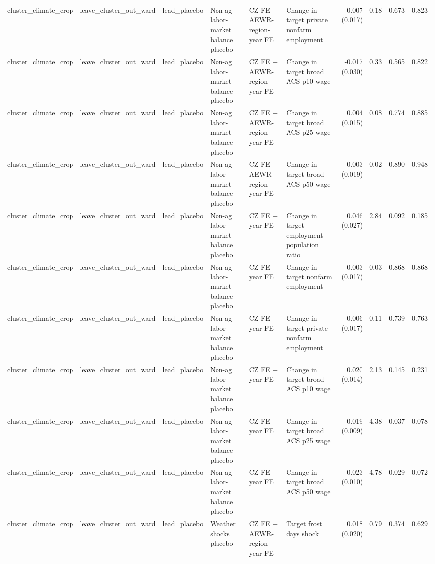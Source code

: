 \begin{tabular}{llllllrrrr}
cluster_climate_crop & leave_cluster_out_ward & lead_placebo & Non-ag labor-market balance placebo & CZ FE + AEWR-region-year FE & Change in target private nonfarm employment & 0.007 (0.017) & 0.18 & 0.673 & 0.823 \\
cluster_climate_crop & leave_cluster_out_ward & lead_placebo & Non-ag labor-market balance placebo & CZ FE + AEWR-region-year FE & Change in target broad ACS p10 wage & -0.017 (0.030) & 0.33 & 0.565 & 0.822 \\
cluster_climate_crop & leave_cluster_out_ward & lead_placebo & Non-ag labor-market balance placebo & CZ FE + AEWR-region-year FE & Change in target broad ACS p25 wage & 0.004 (0.015) & 0.08 & 0.774 & 0.885 \\
cluster_climate_crop & leave_cluster_out_ward & lead_placebo & Non-ag labor-market balance placebo & CZ FE + AEWR-region-year FE & Change in target broad ACS p50 wage & -0.003 (0.019) & 0.02 & 0.890 & 0.948 \\
cluster_climate_crop & leave_cluster_out_ward & lead_placebo & Non-ag labor-market balance placebo & CZ FE + year FE & Change in target employment-population ratio & 0.046 (0.027) & 2.84 & 0.092 & 0.185 \\
cluster_climate_crop & leave_cluster_out_ward & lead_placebo & Non-ag labor-market balance placebo & CZ FE + year FE & Change in target nonfarm employment & -0.003 (0.017) & 0.03 & 0.868 & 0.868 \\
cluster_climate_crop & leave_cluster_out_ward & lead_placebo & Non-ag labor-market balance placebo & CZ FE + year FE & Change in target private nonfarm employment & -0.006 (0.017) & 0.11 & 0.739 & 0.763 \\
cluster_climate_crop & leave_cluster_out_ward & lead_placebo & Non-ag labor-market balance placebo & CZ FE + year FE & Change in target broad ACS p10 wage & 0.020 (0.014) & 2.13 & 0.145 & 0.231 \\
cluster_climate_crop & leave_cluster_out_ward & lead_placebo & Non-ag labor-market balance placebo & CZ FE + year FE & Change in target broad ACS p25 wage & 0.019 (0.009) & 4.38 & 0.037 & 0.078 \\
cluster_climate_crop & leave_cluster_out_ward & lead_placebo & Non-ag labor-market balance placebo & CZ FE + year FE & Change in target broad ACS p50 wage & 0.023 (0.010) & 4.78 & 0.029 & 0.072 \\
cluster_climate_crop & leave_cluster_out_ward & lead_placebo & Weather shocks placebo & CZ FE + AEWR-region-year FE & Target frost days shock & 0.018 (0.020) & 0.79 & 0.374 & 0.629 \\

\end{tabular}
